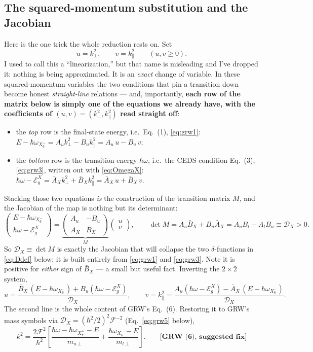 \documentclass[11pt,a4paper]{article}
\numberwithin{equation}{section}
\newcommand{\hw}{\hbar\omega}
\newcommand{\EgX}{\mathcal{E}_g^{X}}
\newcommand{\cD}{\mathcal{D}}
\newcommand{\cF}{\mathcal{F}}
\newcommand{\AX}{\bar{A}_X}
\newcommand{\BX}{\bar{B}_X}
\newcommand{\kperp}{k_{\perp}}
\newcommand{\kpar}{k_{\parallel}}
\newcommand{\wXsix}{\hbar\omega_{X_6^-}}
\newcommand{\wXseven}{\hbar\omega_{X_7^+}}
\newcommand{\grwfix}[1]{\textbf{[GRW~(#1), suggested fix]}}
\begin{document}
\subsection{The squared-momentum substitution and the Jacobian}
\label{sec:Xsub}

Here is the one trick the whole reduction rests on. Set
\[
u=\kperp^2,\qquad v=\kpar^2 \qquad(u,v\ge0).
\]
I used to call this a ``linearization,'' but that name is misleading
and I've dropped it: nothing is being approximated. It is an
\emph{exact} change of variable. In these squared-momentum variables
the two conditions that pin a transition down become honest
\emph{straight-line} relations --- and, importantly, \textbf{each row
of the matrix below is simply one of the equations we already have,
with the coefficients of $(u,v)=(\kperp^2,\kpar^2)$ read straight
off}:
\begin{itemize}
\item the \emph{top} row is the final-state energy, i.e.\ Eq.~(1),
\eqref{eq:grw1}: $E-\wXsix=A_u\kperp^2-B_u\kpar^2=A_u\,u-B_u\,v$;
\item the \emph{bottom} row is the transition energy $\hw$, i.e.\ the
CEDS condition Eq.~(3), \eqref{eq:grw3}, written out with
\eqref{eq:OmegaX}: $\hw-\EgX=\AX\kperp^2+\BX\kpar^2=\AX\,u+\BX\,v$.
\end{itemize}
Stacking those two equations \emph{is} the construction of the
transition matrix $M$, and the Jacobian of the map is nothing but its
determinant:
\begin{equation}
\begin{pmatrix} E-\wXsix\\[2pt] \hw-\EgX\end{pmatrix}
=\underbrace{\begin{pmatrix} A_u & -B_u\\[2pt] \AX & \BX\end{pmatrix}}_{M}
\begin{pmatrix} u\\ v\end{pmatrix},
\qquad
\det M=A_u\BX+B_u\AX=A_uB_l+A_lB_u\equiv\cD_X>0 .
\label{eq:linX}
\end{equation}
So $\cD_X\equiv\det M$ is exactly the Jacobian that will collapse the
two $\delta$-functions in \eqref{eq:Ddef} below; it is built entirely
from \eqref{eq:grw1} and \eqref{eq:grw3}. Note it is positive for
\emph{either} sign of $\BX$ --- a small but useful fact. Inverting the
$2\times2$ system,
\begin{equation}
u=\frac{\BX\,(E-\wXsix)+B_u(\hw-\EgX)}{\cD_X},
\qquad
v=\kpar^2=\frac{A_u(\hw-\EgX)-\AX\,(E-\wXsix)}{\cD_X}.
\label{eq:uvX}
\end{equation}
The second line is the whole content of GRW's Eq.~(6). Restoring it to
GRW's mass symbols via $\cD_X=(\hbar^2/2)^2\cF^{-2}$
(Eq.~\eqref{eq:grw5} below),
\begin{equation}
\kpar^{2}
=\frac{2\cF^{2}}{\hbar^{2}}\left[
\frac{\hw-\wXseven-E}{m_{u\perp}}
+\frac{\wXsix-E}{m_{l\perp}}\right].
\qquad\grwfix{6}
\label{eq:grw6}
\end{equation}
\end{document}
